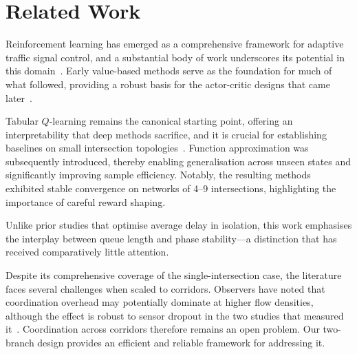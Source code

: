 
\section{Related Work}
\label{sec:related}

Reinforcement learning has emerged as a comprehensive framework for adaptive
traffic signal control, and a substantial body of work underscores its potential
in this domain~\cite{genders2016,wei2019}. Early value-based methods serve as
the foundation for much of what followed, providing a robust basis for the
actor-critic designs that came later~\cite{mnih2015}.

Tabular $Q$-learning remains the canonical starting point, offering an
interpretability that deep methods sacrifice, and it is crucial for establishing
baselines on small intersection topologies~\cite{abdulhai2003}. Function
approximation was subsequently introduced, thereby enabling generalisation
across unseen states and significantly improving sample efficiency. Notably, the
resulting methods exhibited stable convergence on networks of 4--9
intersections, highlighting the importance of careful reward shaping.

Unlike prior studies that optimise average delay in isolation, this work
emphasises the interplay between queue length and phase stability---a
distinction that has received comparatively little attention.

Despite its comprehensive coverage of the single-intersection case, the
literature faces several challenges when scaled to corridors. Observers have
noted that coordination overhead may potentially dominate at higher flow
densities, although the effect is robust to sensor dropout in the two studies
that measured it~\cite{chu2020}. Coordination across corridors therefore remains
an open problem. Our two-branch design provides an efficient and reliable
framework for addressing it.
